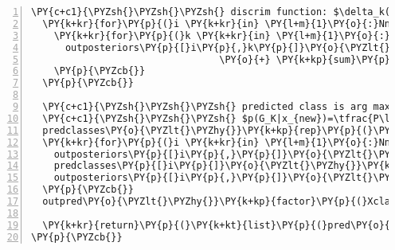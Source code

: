 \begin{Verbatim}[commandchars=\\\{\},codes={\catcode`\$=3\catcode`\^=7\catcode`\_=8},gobble=0,numbers=left,fontfamily=fvm,fontshape=n,fontsize=\footnotesize,tabsize=2]
  \PY{c+c1}{\PYZsh{}\PYZsh{}\PYZsh{} discrim function: $\delta_k(x_{new})$}
  \PY{k+kr}{for}\PY{p}{(}i \PY{k+kr}{in} \PY{l+m}{1}\PY{o}{:}Nnew\PY{p}{)}\PY{p}{\PYZob{}}
    \PY{k+kr}{for}\PY{p}{(}k \PY{k+kr}{in} \PY{l+m}{1}\PY{o}{:}K\PY{p}{)}\PY{p}{\PYZob{}}
      outposteriors\PY{p}{[}i\PY{p}{,}k\PY{p}{]}\PY{o}{\PYZlt{}\PYZhy{}}\PY{k+kp}{log}\PY{p}{(}priors\PY{p}{[}k\PY{p}{]}\PY{p}{)} \PY{o}{\PYZhy{}} ldaobj\PY{o}{\PYZdl{}}consts\PY{p}{[}k\PY{p}{]} 
                                 \PY{o}{+} \PY{k+kp}{sum}\PY{p}{(}Xnew\PY{p}{[}i\PY{p}{,}\PY{p}{]}\PY{o}{*}ldaobj\PY{o}{\PYZdl{}}lins\PY{p}{[[}k\PY{p}{]]}\PY{p}{)}
    \PY{p}{\PYZcb{}}
  \PY{p}{\PYZcb{}}
  
  \PY{c+c1}{\PYZsh{}\PYZsh{}\PYZsh{} predicted class is arg max}
  \PY{c+c1}{\PYZsh{}\PYZsh{}\PYZsh{} $p(G_K|x_{new})=\tfrac{P\left(x_{new}|G_k\right)P\left(G_k\right)}{\sum_{i=1}^{K}P\left(x_{new}|G_i\right)P\left(G_i\right)}$}
  predclasses\PY{o}{\PYZlt{}\PYZhy{}}\PY{k+kp}{rep}\PY{p}{(}\PY{l+m}{0}\PY{p}{,}Nnew\PY{p}{)}
  \PY{k+kr}{for}\PY{p}{(}i \PY{k+kr}{in} \PY{l+m}{1}\PY{o}{:}Nnew\PY{p}{)}\PY{p}{\PYZob{}}
    outposteriors\PY{p}{[}i\PY{p}{,}\PY{p}{]}\PY{o}{\PYZlt{}\PYZhy{}}\PY{k+kp}{exp}\PY{p}{(}outposteriors\PY{p}{[}i\PY{p}{,}\PY{p}{]}\PY{p}{)}
    predclasses\PY{p}{[}i\PY{p}{]}\PY{o}{\PYZlt{}\PYZhy{}}\PY{k+kp}{which.max}\PY{p}{(}outposteriors\PY{p}{[}i\PY{p}{,}\PY{p}{]}\PY{p}{)}
    outposteriors\PY{p}{[}i\PY{p}{,}\PY{p}{]}\PY{o}{\PYZlt{}\PYZhy{}}outposteriors\PY{p}{[}i\PY{p}{,}\PY{p}{]}\PY{o}{/}\PY{k+kp}{sum}\PY{p}{(}outposteriors\PY{p}{[}i\PY{p}{,}\PY{p}{]}\PY{p}{)}
  \PY{p}{\PYZcb{}}
  outpred\PY{o}{\PYZlt{}\PYZhy{}}\PY{k+kp}{factor}\PY{p}{(}Xclasses\PY{p}{[}predclasses\PY{p}{]}\PY{p}{)}
  
  \PY{k+kr}{return}\PY{p}{(}\PY{k+kt}{list}\PY{p}{(}pred\PY{o}{=}outpred\PY{p}{,}posteriors\PY{o}{=}outposteriors\PY{p}{)}\PY{p}{)}
\PY{p}{\PYZcb{}}
\end{Verbatim}
